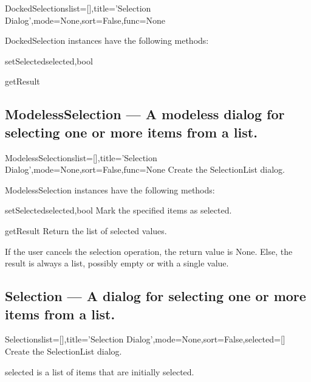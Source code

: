 \begin{classdesc}{DockedSelection}{slist=[],title='Selection Dialog',mode=None,sort=False,func=None}

\end{classdesc}

DockedSelection instances have the following methods:

\begin{funcdesc}{setSelected}{selected,bool}

\end{funcdesc}

\begin{funcdesc}{getResult}{}

\end{funcdesc}

\subsection{ModelessSelection --- A modeless dialog for selecting one or more items from a list.}


\begin{classdesc}{ModelessSelection}{slist=[],title='Selection Dialog',mode=None,sort=False,func=None}
Create the SelectionList dialog.
        
\end{classdesc}

ModelessSelection instances have the following methods:

\begin{funcdesc}{setSelected}{selected,bool}
Mark the specified items as selected.
\end{funcdesc}

\begin{funcdesc}{getResult}{}
Return the list of selected values.

        If the user cancels the selection operation, the return value is None.
        Else, the result is always a list, possibly empty or with a single
        value.
        
\end{funcdesc}

\subsection{Selection --- A dialog for selecting one or more items from a list.}


\begin{classdesc}{Selection}{slist=[],title='Selection Dialog',mode=None,sort=False,selected=[]}
Create the SelectionList dialog.

        selected is a list of items that are initially selected.
        
\end{classdesc}

